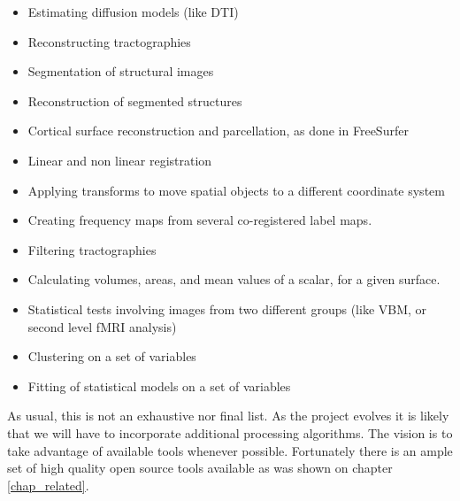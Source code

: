\begin{itemize}
\item Estimating diffusion models (like DTI)
\item Reconstructing tractographies
\item Segmentation of structural images
\item Reconstruction of segmented structures
\item Cortical surface reconstruction and parcellation, as done in FreeSurfer
\item Linear and non linear registration
\item Applying transforms to move spatial objects to a different coordinate system
\item Creating frequency maps from several co-registered label maps.
\item Filtering tractographies
\item Calculating volumes, areas, and mean values of a scalar, for a given surface.
\item Statistical tests involving images from two different groups (like VBM, or second level fMRI analysis)
\item Clustering on a set of variables
\item Fitting of statistical models on a set of variables
\end{itemize}

As usual, this is not an exhaustive nor final list. As the project evolves it is likely that we will have to incorporate additional processing algorithms. The vision is to take advantage of available tools whenever possible. Fortunately there is an ample set of high quality open source tools available as was shown on chapter \ref{chap_related}.


